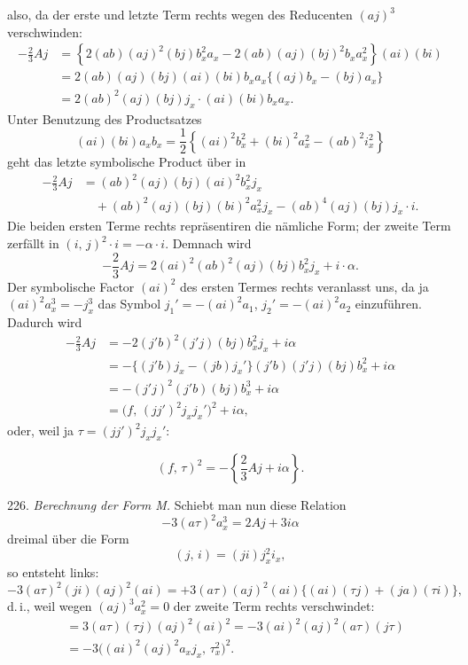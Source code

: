 \documentclass[11pt]{article}
\providecommand{\weberpage}[1]{}
\providecommand{\weq}[2]{\begin{equation}\tag{#1}#2\end{equation}}
\begin{document}
\weberpage{250}

also, da der erste und letzte Term rechts wegen des Reducenten $(aj)^3$ verschwinden:
\[
\begin{aligned}
-\frac{2}{3}Aj &= \left\{2(ab)(aj)^2(bj)b_x^2a_x - 2(ab)(aj)(bj)^2b_xa_x^2\right\}(ai)(bi)\\
&= 2(ab)(aj)(bj)(ai)(bi)b_xa_x\{(aj)b_x - (bj)a_x\}\\
&= 2(ab)^2(aj)(bj)j_x\cdot(ai)(bi)b_xa_x.
\end{aligned}
\]
Unter Benutzung des Productsatzes
\[
(ai)(bi)a_xb_x = \frac{1}{2}\left\{(ai)^2b_x^2 + (bi)^2a_x^2 - (ab)^2i_x^2\right\}
\]
geht das letzte symbolische Product über in
\[
\begin{aligned}
-\frac{2}{3}Aj &= (ab)^2(aj)(bj)(ai)^2b_x^2j_x\\
&\quad + (ab)^2(aj)(bj)(bi)^2a_x^2j_x - (ab)^4(aj)(bj)j_x\cdot i.
\end{aligned}
\]
Die beiden ersten Terme rechts repräsentiren die nämliche Form; der zweite Term zerfällt in $(i,\,j)^2\cdot i = -\alpha\cdot i$. Demnach wird
\[
-\frac{2}{3}Aj = 2(ai)^2(ab)^2(aj)(bj)b_x^2j_x + i\cdot\alpha.
\]
Der symbolische Factor $(ai)^2$ des ersten Termes rechts veranlasst uns, da ja $(ai)^2a_x^3 = -j_x^3$ das Symbol $j_1' = -(ai)^2a_1$, $j_2' = -(ai)^2a_2$ einzuführen. Dadurch wird
\[
\begin{aligned}
-\frac{2}{3}Aj &= -2(j'b)^2(j'j)(bj)b_x^2j_x + i\alpha\\
&= -\{(j'b)j_x - (jb)j_x'\}(j'b)(j'j)(bj)b_x^2 + i\alpha\\
&= -(j'j)^2(j'b)(bj)b_x^3 + i\alpha\\
&= \big(f,\,(jj')^2j_xj_x'\big)^2 + i\alpha,
\end{aligned}
\]
oder, weil ja $\tau = (jj')^2j_xj_x'$:

\weq{1}{(f,\,\tau)^2 = -\left\{\frac{2}{3}Aj + i\alpha\right\}.}

226. \textit{Berechnung der Form M.} Schiebt man nun diese Relation
\[
-3(a\tau)^2a_x^3 = 2Aj + 3i\alpha
\]
dreimal über die Form
\[
(j,\,i) = (ji)j_x^2i_x,
\]
so entsteht links:
\[
-3(a\tau)^2(ji)(aj)^2(ai) = +3(a\tau)(aj)^2(ai)\{(ai)(\tau j) + (ja)(\tau i)\},
\]
d.\,i., weil wegen $(aj)^3a_x^2 = 0$ der zweite Term rechts verschwindet:
\[
\begin{aligned}
&= 3(a\tau)(\tau j)(aj)^2(ai)^2 = -3(ai)^2(aj)^2(a\tau)(j\tau)\\
&= -3\big((ai)^2(aj)^2a_xj_x,\,\tau_x^2\big)^2.
\end{aligned}
\]
\end{document}
